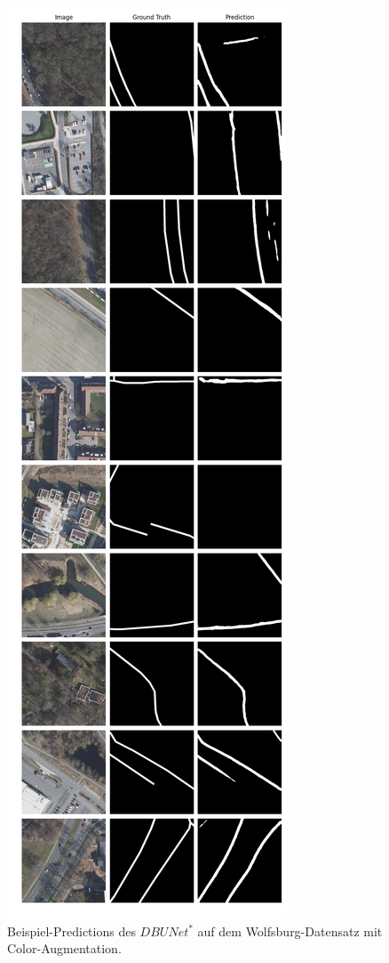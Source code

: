 \begin{figure}
	\centering
	\includegraphics[width=.41\textwidth]{Bilder/wolfsburg-color-samples/dbunet-s.png}
	\caption{Beispiel-Predictions des $DBUNet^*$ auf dem Wolfsburg-Datensatz mit Color-Augmentation.}
	\label{fig:wolfsburg-color-samples-dbunet-s}
\end{figure}



